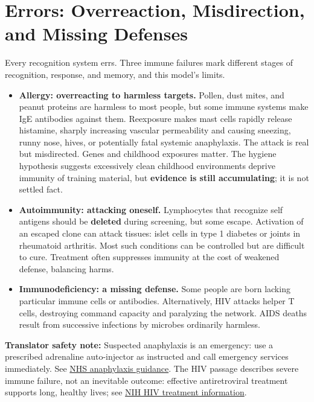 \section{Errors: Overreaction, Misdirection, and Missing Defenses}

Every recognition system errs. Three immune failures mark different stages of recognition, response, and memory, and this model's limits.

\begin{itemize}[itemsep=2pt]
\item \textbf{Allergy: overreacting to harmless targets.} Pollen, dust mites, and peanut proteins are harmless to most people, but some immune systems make IgE antibodies against them. Reexposure makes mast cells rapidly release histamine, sharply increasing vascular permeability and causing sneezing, runny nose, hives, or potentially fatal systemic anaphylaxis. The attack is real but misdirected. Genes and childhood exposures matter. The hygiene hypothesis suggests excessively clean childhood environments deprive immunity of training material, but \textbf{evidence is still accumulating}; it is not settled fact.
\item \textbf{Autoimmunity: attacking oneself.} Lymphocytes that recognize self antigens should be \textbf{deleted} during screening, but some escape. Activation of an escaped clone can attack tissues: islet cells in type 1 diabetes or joints in rheumatoid arthritis. Most such conditions can be controlled but are difficult to cure. Treatment often suppresses immunity at the cost of weakened defense, balancing harms.
\item \textbf{Immunodeficiency: a missing defense.} Some people are born lacking particular immune cells or antibodies. Alternatively, HIV attacks helper T cells, destroying command capacity and paralyzing the network. AIDS deaths result from successive infections by microbes ordinarily harmless.
\end{itemize}

\textbf{Translator safety note:} Suspected anaphylaxis is an emergency: use a prescribed adrenaline auto-injector as instructed and call emergency services immediately. See \href{https://www.nhs.uk/conditions/anaphylaxis/}{NHS anaphylaxis guidance}. The HIV passage describes severe immune failure, not an inevitable outcome: effective antiretroviral treatment supports long, healthy lives; see \href{https://hivinfo.nih.gov/understanding-hiv/fact-sheets/hiv-treatment-basics}{NIH HIV treatment information}.

